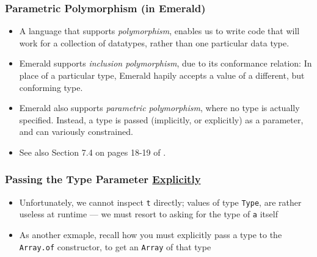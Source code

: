 \begin{frame}

\frametitle{Parametric Polymorphism (in Emerald)}

\begin{itemize}

\item A language that supports \emph{polymorphism}, enables us to
write code that will work for a collection of datatypes, rather than
one particular data type.

\item Emerald supports \emph{inclusion polymorphism}, due to its
conformance relation: In place of a particular type, Emerald hapily
accepts a value of a different, but conforming type.

\item Emerald also supports \emph{parametric polymorphism}, where no
type is actually specified. Instead, a type is passed (implicitly, or
explicitly) as a parameter, and can variously constrained.

\item See also Section 7.4 on pages 18-19 of \cite{report1991}.

\end{itemize}

\end{frame}

\begin{frame}[fragile]

\frametitle{Passing the Type Parameter \underline{Explicitly}}


\begin{itemize}

\item Unfortunately, we cannot inspect \lstinline{t} directly; values
of type \lstinline{Type}, are rather useless at runtime --- we must
resort to asking for the type of \lstinline{a} itself

\item As another exmaple, recall how you must explicitly pass a type
to the \lstinline{Array.of} constructor, to get an \lstinline{Array}
of that type

\end{itemize}

\end{frame}

